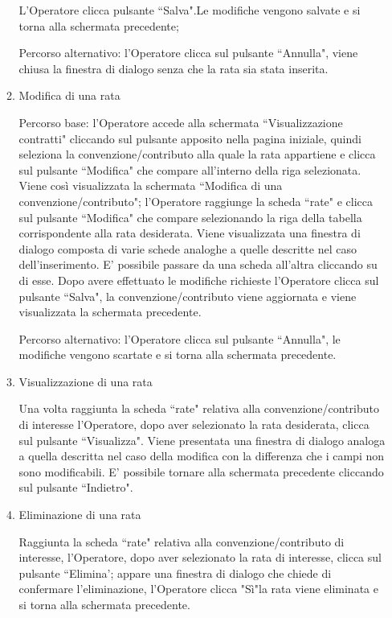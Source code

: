 \begin{enumerate}
\begin{enumerate}
L'Operatore clicca pulsante \textquotedblleft Salva".Le modifiche vengono salvate e si torna alla schermata precedente;

Percorso alternativo:
l'Operatore clicca sul pulsante ``Annulla", viene chiusa la finestra di dialogo senza che la rata sia stata inserita.

\item Modifica di una rata\\ \label{UC_edit_installment}

Percorso base:
l'Operatore accede alla schermata ``Visualizzazione contratti" cliccando sul pulsante apposito nella pagina iniziale, quindi seleziona la convenzione/contributo alla quale la rata appartiene e clicca sul pulsante ``Modifica" che compare
all'interno della riga selezionata. Viene così visualizzata la schermata ``Modifica di una convenzione/contributo"; l'Operatore raggiunge la scheda ``rate" e clicca sul pulsante ``Modifica" che compare selezionando la riga della tabella
corrispondente alla rata desiderata. Viene visualizzata una finestra di dialogo composta di varie schede analoghe a quelle descritte nel caso dell'inserimento. E' possibile passare da una scheda all'altra cliccando su di esse.
Dopo avere effettuato le modifiche richieste l'Operatore clicca sul pulsante ``Salva", la convenzione/contributo viene aggiornata e viene visualizzata la schermata precedente.

Percorso alternativo:
l'Operatore clicca sul pulsante ``Annulla", le modifiche vengono scartate e si torna alla schermata precedente.

\item Visualizzazione di una rata \label{UC_view_installment}

Una volta raggiunta la scheda ``rate" relativa alla convenzione/contributo di interesse l'Operatore, dopo aver selezionato la rata desiderata, clicca sul pulsante ``Visualizza". Viene presentata una finestra di dialogo analoga a quella descritta nel caso della modifica 
con la differenza che i campi non sono modificabili. E' possibile tornare alla schermata precedente cliccando sul pulsante ``Indietro".

\item Eliminazione di una rata\\ \label{UC_delete_installment}

Raggiunta la scheda ``rate" relativa alla convenzione/contributo di interesse, l'Operatore, dopo aver selezionato la rata di interesse, clicca sul pulsante ``Elimina'; appare una finestra di dialogo che chiede di confermare
l'eliminazione, l'Operatore clicca "Sì"la rata viene eliminata e si torna alla schermata precedente.


\end{enumerate}
\end{enumerate}
